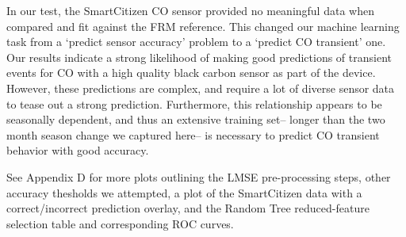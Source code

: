 In our test, the SmartCitizen CO sensor provided no meaningful data when compared and fit against the FRM reference.  This changed our machine learning task from a `predict sensor accuracy' problem to a `predict CO transient' one.  Our results indicate a strong likelihood of making good predictions of transient events for CO with a high quality black carbon sensor as part of the device.  However, these predictions are complex, and require a lot of diverse sensor data to tease out a strong prediction.  Furthermore, this relationship appears to be seasonally dependent, and thus an extensive training set-- longer than the two month season change we captured here-- is necessary to predict CO transient behavior with good accuracy.

See Appendix D for more plots outlining the LMSE pre-processing steps, other accuracy thesholds we attempted, a plot of the SmartCitizen data with a correct/incorrect prediction overlay, and the Random Tree reduced-feature selection table and corresponding ROC curves. 


